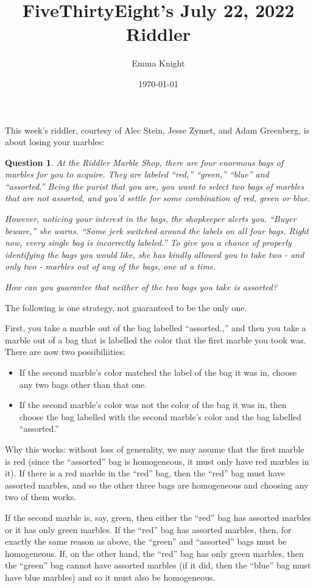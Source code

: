 \documentclass[11pt]{article}
\title{FiveThirtyEight's July 22, 2022 Riddler}
\author{Emma Knight}
\date{\today}
\newtheorem{question}[theorem]{Question}
\theoremstyle{definition}
\begin{document}
\maketitle
This week's riddler, courtesy of Alec Stein, Jesse Zymet, and Adam Greenberg, is about losing your marbles:
\begin{question}
At the Riddler Marble Shop, there are four enormous bags of marbles for you to acquire. They are labeled ``red,'' ``green,'' ``blue'' and ``assorted.'' Being the purist that you are, you want to select two bags of marbles that are not assorted, and you’d settle for some combination of red, green or blue.

However, noticing your interest in the bags, the shopkeeper alerts you. ``Buyer beware,'' she warns. ``Some jerk switched around the labels on all four bags. Right now, every single bag is incorrectly labeled.'' To give you a chance of properly identifying the bags you would like, she has kindly allowed you to take two - and only two - marbles out of any of the bags, one at a time.

How can you guarantee that neither of the two bags you take is assorted?
\end{question}
The following is one strategy, not guaranteed to be the only one.

First, you take a marble out of the bag labelled ``assorted.,'' and then you take a marble out of a bag that is labelled the color that the first marble you took was.  There are now two possibiliities:
\begin{itemize}
\item If the second marble's color matched the label of the bag it was in, choose any two bags other than that one.
\item If the second marble's color was not the color of the bag it was in, then choose the bag labelled with the second marble's color and the bag labelled ``assorted.''
\end{itemize}

Why this works: without loss of generality, we may assume that the first marble is red (since the ``assorted'' bag is homogeneous, it must only have red marbles in it).  If there is a red marble in the ``red'' bag, then the ``red'' bag must have assorted marbles, and so the other three bags are homogeneous and choosing any two of them works.

If the second marble is, say, green, then either the ``red'' bag has assorted marbles or it has only green marbles.  If the ``red'' bag has assorted marbles, then, for exactly the same reason as above, the ``green'' and ``assorted'' bags must be homogeneous.  If, on the other hand, the ``red'' bag has only green marbles, then the ``green'' bag cannot have assorted marbles (if it did, then the ``blue'' bag must have blue marbles) and so it must also be homogeneous. 
\end{document}
